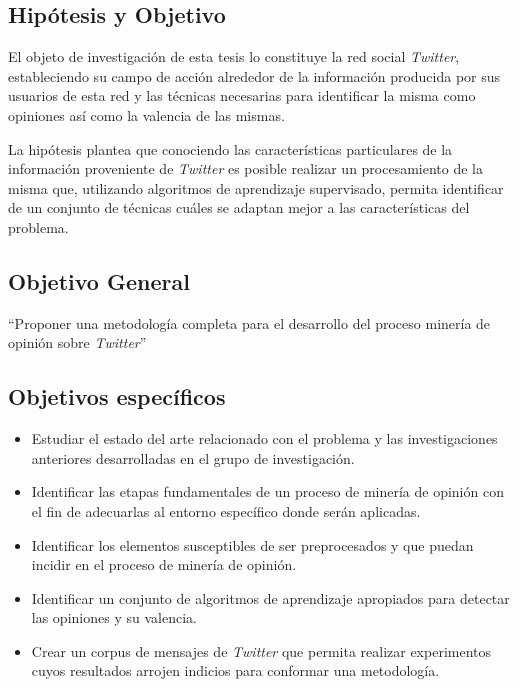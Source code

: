 \begin{introduction}
\section*{Hipótesis y Objetivo}

El objeto de investigación de esta tesis
lo constituye la red social \emph{Twitter},
estableciendo su campo de acción alrededor
de la información
producida por sus usuarios de esta red y las
técnicas necesarias para identificar la misma
como opiniones así como la valencia de las mismas.

La hipótesis plantea que conociendo las características
particulares de la información proveniente de \emph{Twitter}
es posible realizar un procesamiento de la misma que,
utilizando algoritmos de aprendizaje supervisado, 
permita identificar de un conjunto de técnicas cuáles 
se adaptan mejor a las características del problema. 
  
  \subsection*{Objetivo General}
  
  ``Proponer una metodología completa para el desarrollo del proceso
minería de opinión sobre \emph{Twitter}''

  \subsection*{Objetivos específicos}
\begin{itemize}
  \item Estudiar el estado del arte relacionado con el problema
  y las investigaciones anteriores 
  desarrolladas en el grupo de investigación.
  \item Identificar las etapas fundamentales de un proceso de 
  minería de opinión con el fin de adecuarlas al entorno específico
  donde serán aplicadas.
 \item Identificar los elementos susceptibles de ser preprocesados
 y que puedan incidir en el proceso de minería de opinión.
 \item Identificar un conjunto de algoritmos de aprendizaje apropiados
 para detectar las opiniones y su valencia.
 \item Crear un corpus de mensajes de \emph{Twitter} que permita realizar 
 experimentos cuyos resultados arrojen indicios para conformar una metodología.
\end{itemize}


\end{introduction}
